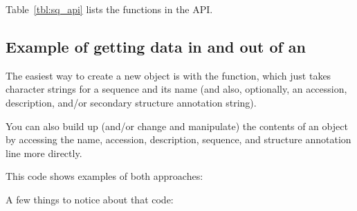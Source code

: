 Table~\ref{tbl:sq_api} lists the functions in the  API.








\subsection{Example of getting data in and out of an }

The easiest way to create a new  object is with the
 function, which just takes character
strings for a sequence and its name (and also, optionally, an
accession, description, and/or secondary structure annotation string).

You can also build up (and/or change and manipulate) the contents of
an  object by accessing the name, accession,
description, sequence, and structure annotation line more directly.

This code shows examples of both approaches:



A few things to notice about that code:

